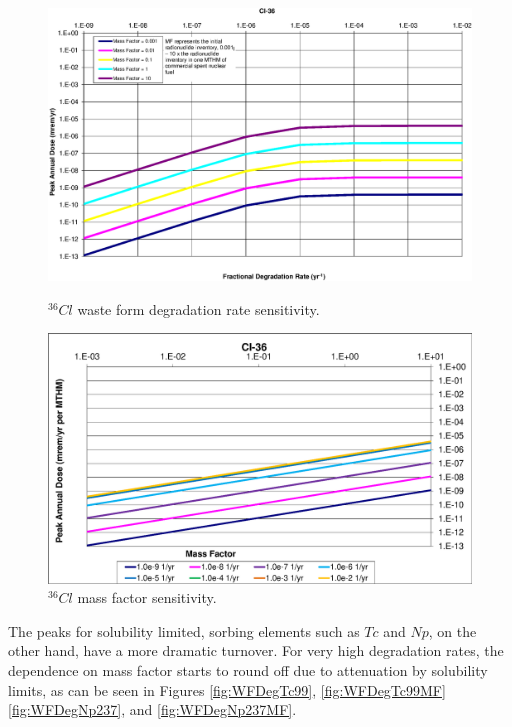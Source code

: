 \begin{figure}[ht]
\begin{minipage}[b]{0.45\linewidth}

\includegraphics[width=\linewidth]{./chapters/nuclide_sensitivity/clay/WFDegAndInv/Cl-36.eps}
\caption{$^{36}Cl$ waste form degradation rate sensitivity.}
\label{fig:WFDegCl36}

\end{minipage}
\hspace{0.05\linewidth}
\begin{minipage}[b]{0.45\linewidth}

\includegraphics[width=\linewidth]{./chapters/nuclide_sensitivity/clay/WFDegAndInv/Cl-36-MF.eps}
\caption{$^{36}Cl$ mass factor sensitivity.}
\label{fig:WFDegCl36MF}
\end{minipage}
\end{figure}

The peaks for solubility limited, sorbing elements such as $Tc$ and $Np$, on the 
other hand, have a more dramatic turnover.  For very high degradation rates, the 
dependence on mass factor starts to round off due to attenuation by solubility 
limits, as can be seen in Figures \ref{fig:WFDegTc99}, \ref{fig:WFDegTc99MF} 
\ref{fig:WFDegNp237}, and \ref{fig:WFDegNp237MF}. 

